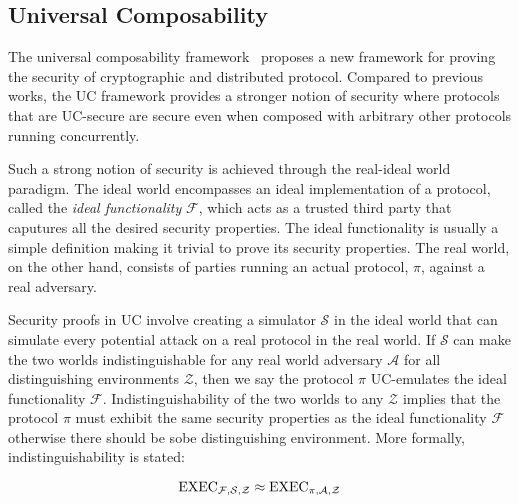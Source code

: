 \subsection{Universal Composability}
The universal composability framework~\cite{uc} proposes a new framework for proving the security of cryptographic and distributed protocol.
Compared to previous works, the UC framework provides a stronger notion of security where protocols that are UC-secure are secure even when composed with arbitrary other protocols running concurrently. 

Such a strong notion of security is achieved through the real-ideal world paradigm.
The ideal world encompasses an ideal implementation of a protocol, called the \textit{ideal functionality} $\mathcal{F}$, which acts as a trusted third party that caputures all the desired security properties.
The ideal functionality is usually a simple definition making it trivial to prove its security properties.
The real world, on the other hand, consists of parties running an actual protocol, $\pi$, against a real adversary.

Security proofs in UC involve creating a simulator $\mathcal{S}$ in the ideal world that can simulate every potential attack on a real protocol in the real world.
If $\mathcal{S}$ can make the two worlds indistinguishable for any real world adversary $\mathcal{A}$ for all distinguishing environments $\mathcal{Z}$, then we say the protocol $\pi$ UC-emulates the ideal functionality $\mathcal{F}$.
Indistinguishability of the two worlds to any $\mathcal{Z}$ implies that the protocol $\pi$ must exhibit the same security properties as the ideal functionality $\mathcal{F}$ otherwise there should be sobe distinguishing environment. 
More formally, indistinguishability is stated:

$$ \text{EXEC}_{\mathcal{F},\mathcal{S},\mathcal{Z}} \approx \text{EXEC}_{\pi,\mathcal{A},\mathcal{Z}} $$



